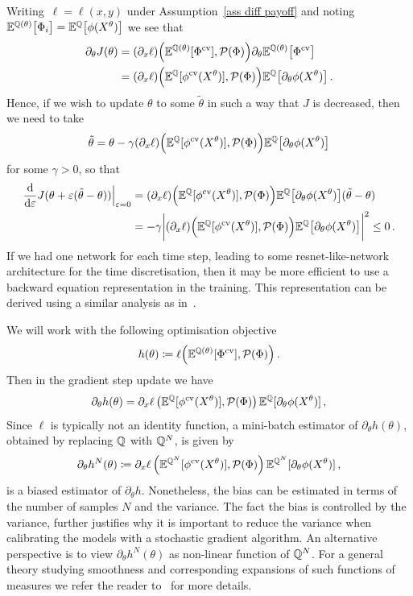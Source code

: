 Writing~$\ell = \ell(x,y)$ under Assumption~\ref{ass diff payoff} and noting~${\mathbb{E}^{\mathbb{Q}(\theta)} \big[ \Phi_i \big] = \mathbb{E}^{\mathbb{Q}} \big[ \phi(X^\theta) \big]}$ we see that
\[
\begin{split}
\partial_\theta J(\theta) & =  (\partial_x \ell)\Big(\mathbb{E}^{\mathbb{Q}(\theta)}[\Phi^{\textup{cv}}], \mathcal{P}(\Phi) \Big) \partial_\theta \mathbb{E}^{\mathbb{Q}(\theta)} \big[ \Phi^{\textup{cv}} \big] \\
& =  (\partial_x \ell)\Big(\mathbb{E}^{\mathbb{Q}}[\phi^{\textup{cv}}(X^\theta)], \mathcal{P}(\Phi) \Big) \mathbb{E}^{\mathbb{Q}} \big[ \partial_\theta \phi(X^\theta) \big]\,. 	
\end{split}
\]
Hence, if we wish to update $\theta$ to some $\tilde \theta$ in such a way that $J$ is decreased, then we need to take 
\[
\tilde \theta = \theta - \gamma  (\partial_x \ell)\Big(\mathbb{E}^{\mathbb{Q}}[\phi^{\textup{cv}}(X^\theta)], \mathcal{P}(\Phi) \Big) \mathbb{E}^{\mathbb{Q}} \big[ \partial_\theta \phi(X^\theta) \big] 
\]
for some $\gamma > 0$, so that
\[
\begin{split}
\frac{\mathrm{d}}{\mathrm{d}\varepsilon} J(\theta + \varepsilon (\tilde \theta - \theta)) \Big \rvert_{\varepsilon=0} 
 & = (\partial_x \ell)\Big(\mathbb{E}^{\mathbb{Q}}[\phi^{\textup{cv}}(X^\theta)], \mathcal{P}(\Phi) \Big) \mathbb{E}^{\mathbb{Q}} \big[ \partial_\theta \phi(X^\theta) \big](\tilde \theta - \theta)\\
& = - \gamma \bigg|  (\partial_x \ell)\Big(\mathbb{E}^{\mathbb{Q}}[\phi^{\textup{cv}}(X^\theta)], \mathcal{P}(\Phi) \Big) \mathbb{E}^{\mathbb{Q}} \big[ \partial_\theta \phi(X^\theta) \big]\bigg|^2 \leq 0\,.
\end{split}
\]
If we had one network for each time step, leading to some resnet-like-network architecture for the time discretisation, then it may be more efficient to use a backward equation representation in the training. 
This representation can be derived using a similar analysis as in~\cite{Jabir2019Mean-FieldControl, Siska2020GradientProblems}. 

We will work with the following optimisation objective
\[
h(\theta) \coloneqq  \ell\Big(\mathbb{E}^{\mathbb{Q}(\theta)}[\Phi^{\textup{cv}}], \mathcal{P}(\Phi)\Big)\,.	
\]
Then in the gradient step update we have 
\[
\partial_{\theta}h(\theta) =  \partial_x \ell\left(\mathbb{E}^{\mathbb{Q}}[\phi^{\textup{cv}}(X^{\theta})],\mathcal{P}(\Phi) \right) \mathbb{E}^{\mathbb{Q}}[\partial_\theta \phi(X^{\theta})]\,,
\]
Since $\ell$ is typically not an identity function, a mini-batch estimator of 
$\partial_{\theta}h(\theta)$, obtained by replacing $\mathbb{Q}$ with $\mathbb{Q}^N$, is given by
\[
\partial_{\theta}h^{N}(\theta) \coloneqq   \partial_x \ell\left(\mathbb{E}^{\mathbb{Q}^N}[\phi^{\textup{cv}}(X^{\theta})],\mathcal{P}(\Phi) \right) \mathbb{E}^{\mathbb{Q}^N}[\partial_\theta \phi(X^{\theta})]\,,
\]
is a biased estimator of $\partial_{\theta}h$. Nonetheless, the bias can be estimated in terms of the number of samples $N$ and the variance. The fact the bias is controlled by the variance, further justifies why it is important to reduce the variance when calibrating the models with a stochastic gradient algorithm. 
An alternative perspective is to view $\partial_{\theta}h^{N}(\theta) $ as non-linear function of $\mathbb{Q}^N$. For a general theory studying smoothness and corresponding expansions of such functions of measures we refer the reader to~\cite{Chassagneux2019WeakMeasures} for more details. 


